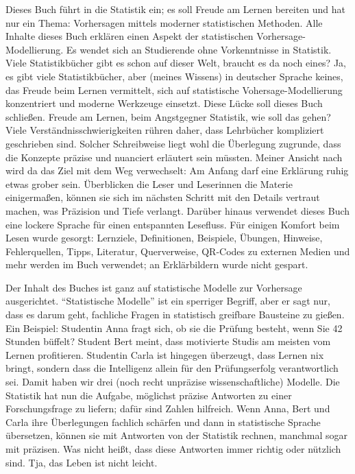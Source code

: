 \documentclass[
  letterpaper,
  oneside,
  open=any]{scrbook}
\theoremstyle{definition}
\theoremstyle{definition}
\theoremstyle{definition}
\theoremstyle{remark}
\begin{document}
Dieses Buch führt in die Statistik ein; es soll Freude am Lernen
bereiten und hat nur ein Thema: Vorhersagen mittels moderner
statistischen Methoden. Alle Inhalte dieses Buch erklären einen Aspekt
der statistischen Vorhersage-Modellierung. Es wendet sich an Studierende
ohne Vorkenntnisse in Statistik. Viele Statistikbücher gibt es schon auf
dieser Welt, braucht es da noch eines? Ja, es gibt viele
Statistikbücher, aber (meines Wissens) in deutscher Sprache keines, das
Freude beim Lernen vermittelt, sich auf statistische
Vohersage-Modellierung konzentriert und moderne Werkzeuge einsetzt.
Diese Lücke soll dieses Buch schließen. Freude am Lernen, beim
Angstgegner Statistik, wie soll das gehen? Viele
Verständnisschwierigkeiten rühren daher, dass Lehrbücher kompliziert
geschrieben sind. Solcher Schreibweise liegt wohl die Überlegung
zugrunde, dass die Konzepte präzise und nuanciert erläutert sein
müssten. Meiner Ansicht nach wird da das Ziel mit dem Weg verwechselt:
Am Anfang darf eine Erklärung ruhig etwas grober sein. Überblicken die
Leser und Leserinnen die Materie einigermaßen, können sie sich im
nächsten Schritt mit den Details vertraut machen, was Präzision und
Tiefe verlangt. Darüber hinaus verwendet dieses Buch eine lockere
Sprache für einen entspannten Lesefluss. Für einigen Komfort beim Lesen
wurde gesorgt: Lernziele, Definitionen, Beispiele, Übungen, Hinweise,
Fehlerquellen, Tipps, Literatur, Querverweise, QR-Codes zu externen
Medien und mehr werden im Buch verwendet; an Erklärbildern wurde nicht
gespart.

Der Inhalt des Buches ist ganz auf statistische Modelle zur Vorhersage
ausgerichtet. \enquote{Statistische Modelle} ist ein sperriger Begriff,
aber er sagt nur, dass es darum geht, fachliche Fragen in statistisch
greifbare Bausteine zu gießen. Ein Beispiel: Studentin Anna fragt sich,
ob sie die Prüfung besteht, wenn Sie 42 Stunden büffelt? Student Bert
meint, dass motivierte Studis am meisten vom Lernen profitieren.
Studentin Carla ist hingegen überzeugt, dass Lernen nix bringt, sondern
dass die Intelligenz allein für den Prüfungserfolg verantwortlich sei.
Damit haben wir drei (noch recht unpräzise wissenschaftliche) Modelle.
Die Statistik hat nun die Aufgabe, möglichst präzise Antworten zu einer
Forschungsfrage zu liefern; dafür sind Zahlen hilfreich. Wenn Anna, Bert
und Carla ihre Überlegungen fachlich schärfen und dann in statistische
Sprache übersetzen, können sie mit Antworten von der Statistik rechnen,
manchmal sogar mit präzisen. Was nicht heißt, dass diese Antworten immer
richtig oder nützlich sind. Tja, das Leben ist nicht leicht.
\end{document}
